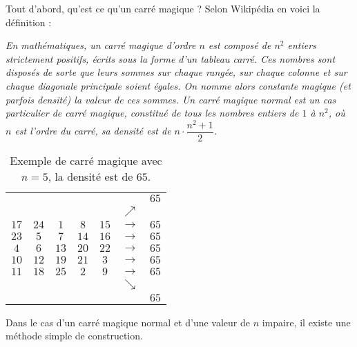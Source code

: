 
Tout d'abord, qu'est ce qu'un carré magique ? Selon Wikipédia en voici la définition :

\textsl{\og En mathématiques, un carré magique d'ordre $n$ est composé de $n^2$ entiers strictement positifs, écrits sous la forme d'un tableau carré. Ces nombres sont disposés de sorte que leurs sommes sur chaque rangée, sur chaque colonne et sur chaque diagonale principale soient égales. On nomme alors constante magique (et parfois densité) la valeur de ces sommes. Un carré magique normal est un cas particulier de carré magique, constitué de tous les nombres entiers de $1$ à $n^2$, où $n$ est l'ordre du carré, sa densité est de $n\cdot\dfrac{n^2+1}{2}$.\fg}\\
\renewcommand{\arraystretch}{1.5}
\begin{table}[htbp]
	\centering
		\begin{tabular}{|*{5}{c|}cc}
			\multicolumn{6}{r}{}                &$65$\\
		  \multicolumn{6}{r}{$\nearrow$}      &   \\
			\cline{1-5}
			$17$&$24$&$1$&$8$&$15$&$\rightarrow$&$65$\\
			\cline{1-5}
			$23$&$5$&$7$&$14$&$16$&$\rightarrow$&$65$\\
			\cline{1-5}
			$4$&$6$&$13$&$20$&$22$&$\rightarrow$&$65$\\
			\cline{1-5}
			$10$&$12$&$19$&$21$&$3$&$\rightarrow$&$65$\\
			\cline{1-5}
			$11$&$18$&$25$&$2$&$9$&$\rightarrow$&$65$\\
			\cline{1-5}
			\multicolumn{6}{r}{$\searrow$}      &   \\
			\multicolumn{6}{r}{}                &$65$\\
		  
		\end{tabular}
		\caption{Exemple de carré magique avec $n=5$, la densité est de $65$.}
\end{table}
\renewcommand{\arraystretch}{1}



Dans le cas d'un carré magique normal et d'une valeur de $n$ impaire, il existe une méthode simple de construction.


